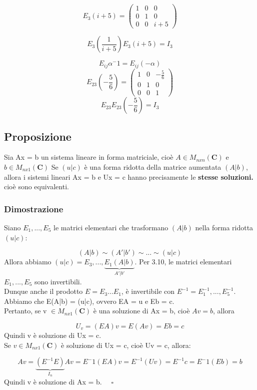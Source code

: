 \documentclass[12pt]{article}
\begin{document}
\[E_3(i+5) =
\begin{pmatrix}
    1 & 0 & 0\\
    0 & 1 & 0\\
    0 & 0 & i+5
\end{pmatrix}
\]

\[E_3\left(\frac{1}{i+5}\right)E_3(i+5) = I_3\]

\[E_{ij}\alpha^-1 = E_{ij}(-\alpha)\]
\[E_{23}\left(-\frac{5}{6}\right) = \begin{pmatrix}
    1 & 0 & -\frac{5}{6}\\
    0 & 1 & 0\\
    0 & 0 & 1
\end{pmatrix}\]
\[E_{23}E_{23}\left(-\frac{5}{6}\right) = I_3\]

\subsection{Proposizione}

Sia Ax = b un sistema lineare in forma matriciale, cioè $A \in M_{nxn} (\mathbf{C})$ e $b \in M_{nx1} (\mathbf{C})$ Se $(u | c)$ è una forma ridotta della matrice aumentata $(A | b)$, allora i sistemi lineari Ax = b e Ux = c hanno precisamente le \textbf{stesse soluzioni.} cioè sono equivalenti.

\subsubsection{Dimostrazione}

Siano $E_1, ..., E_5$ le matrici elementari che trasformano $(A | b)$ nella forma ridotta $(u | c)$:

\[(A|b) \sim (A'|b') \sim ... \sim (u|c)\]
Allora abbiamo $(u | c) = E_3,...,\underbrace{E_1(A|b)}_{A'|b'}$.
Per 3.10, le matrici elementari $E_1,...,E_5$ sono invertibili. \\Dunque anche il prodotto $E = E_3 ... E_1$, è invertibile con $E^{-1} = E_1^{-1}, ... , E_5^{-1}$.
Abbiamo che E(A|b) = (u|c), ovvero EA = u e Eb = c.\\
Pertanto, se v $\in M_{nx1} (\mathbf{C})$ è una soluzione di Ax = b, cioè $Av = b$, allora

\[U_v = (EA)v = E(Av) = Eb = c \]
Quindi v è soluzione di Ux = c.\\
Se $v \in M_{nx1} (\mathbf{C})$ è soluzione di Ux = c, cioè Uv = c, allora:

\[Av = \underbrace{(E^{-1}E)}_{I_n}Av = E^-1(EA)v = E^{-1}(Uv) = E^{-1}c = E^-1(Eb) = b\]
Quindi v è soluzione di Ax = b. $\quad \square$
\end{document}
